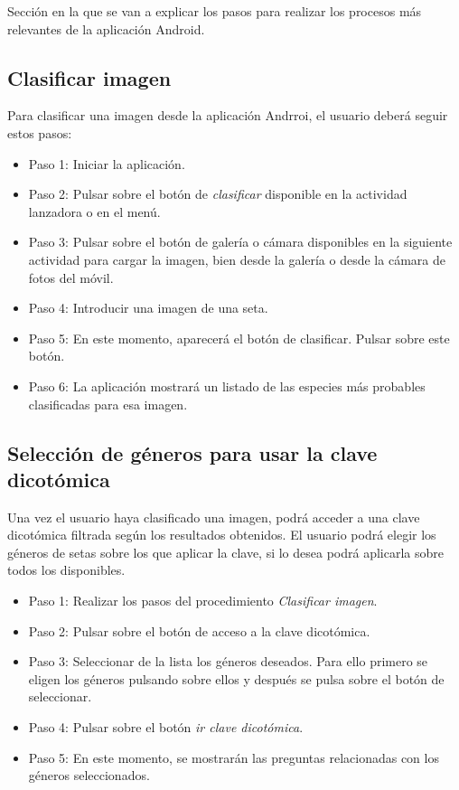 Sección en la que se van a explicar los pasos para realizar los procesos más relevantes de la aplicación Android.

\subsection{Clasificar imagen}

Para clasificar una imagen desde la aplicación Andrroi, el usuario deberá seguir estos pasos:

\begin{itemize}
	\item Paso 1: Iniciar la aplicación.
	\item Paso 2: Pulsar sobre el botón de \textit{clasificar} disponible en la actividad lanzadora o en el menú.
	\item Paso 3: Pulsar sobre el botón de galería o cámara disponibles en la siguiente actividad para cargar la imagen, bien desde la galería o desde la cámara de fotos del móvil.
	\item Paso 4: Introducir una imagen de una seta.
	\item Paso 5: En este momento, aparecerá el botón de clasificar. Pulsar sobre este botón.
	\item Paso 6: La aplicación mostrará un listado de las especies más probables clasificadas para esa imagen.
\end{itemize}

\subsection{Selección de géneros para usar la clave dicotómica}

Una vez el usuario haya clasificado una imagen, podrá acceder a una clave dicotómica filtrada según los resultados obtenidos. El usuario podrá elegir los géneros de setas sobre los que aplicar la clave, si lo desea podrá aplicarla sobre todos los disponibles.

\begin{itemize}
	\item Paso 1: Realizar los pasos del procedimiento \textit{Clasificar imagen}.
	\item Paso 2: Pulsar sobre el botón de acceso a la clave dicotómica.
	\item Paso 3: Seleccionar de la lista los géneros deseados. Para ello primero se eligen los géneros pulsando sobre ellos y después se pulsa sobre el botón de seleccionar.
	\item Paso 4: Pulsar sobre el botón \textit{ir clave dicotómica}.
	\item Paso 5: En este momento, se mostrarán las preguntas relacionadas con los géneros seleccionados.
\end{itemize}

